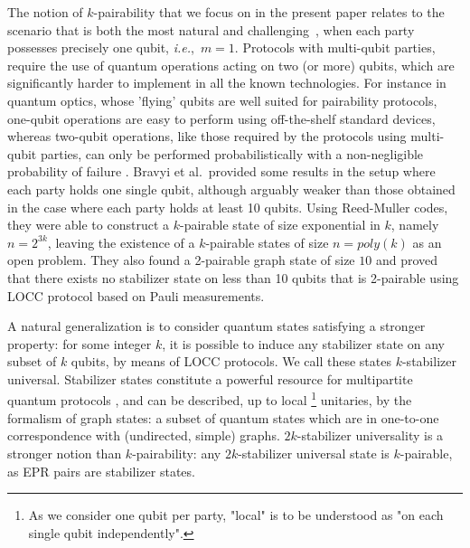 \documentclass[a4paper,UKenglish,cleveref, autoref, thm-restate]{arxiv}
\begin{document}
The notion of $k$-pairability that we focus on in the present paper relates to the scenario that is both the most natural and challenging~\cite{bravyi2022generating}, when each party possesses precisely one qubit, \emph{i.e.},~$m=1$. Protocols with multi-qubit parties, require the use of quantum operations acting on two (or more) qubits, which are significantly harder to implement in all the known technologies. For instance in quantum optics, whose 'flying' qubits are well suited for pairability protocols, one-qubit operations are easy to perform using off-the-shelf standard devices, whereas two-qubit operations, like those required by the protocols using multi-qubit parties, can only be performed probabilistically with a non-negligible probability of failure \cite{bartolucci2023fusion,Lee2023graphtheoretical,ghanbari2024optimization,lu2007experimental}. Bravyi et al.~provided some results in the setup where each party holds one single qubit, although arguably weaker than those obtained in the case where each party holds at least 10 qubits. Using Reed-Muller codes,  they were able to construct a $k$-pairable state of size  exponential in $k$, namely $n = 2^{3k}$,  leaving  the existence of a $k$-pairable states of size $n=poly(k)$ as an open problem. They also found a 2-pairable graph state of size $10$ and proved that there exists no stabilizer state on less than 10 qubits that is 2-pairable using LOCC protocol based on Pauli measurements.

A natural generalization is to consider quantum states satisfying a stronger property: for some integer $k$, it is possible to induce any stabilizer state on any subset of $k$ qubits, by means of LOCC protocols. We call these states $k$-stabilizer universal. Stabilizer states constitute a powerful resource for multipartite quantum protocols \cite{Hein06,MS08, javelle2012new, vrana2017entanglement}, and can be described, up to local \footnote{As we consider one qubit per party, "local" is to be understood as "on each single qubit independently".} unitaries, by the formalism of graph states: a subset of quantum states which are in one-to-one correspondence with (undirected, simple) graphs. $2k$-stabilizer universality is a stronger notion than $k$-pairability: any $2k$-stabilizer universal state is $k$-pairable, as EPR pairs are stabilizer states. 
\end{document}
